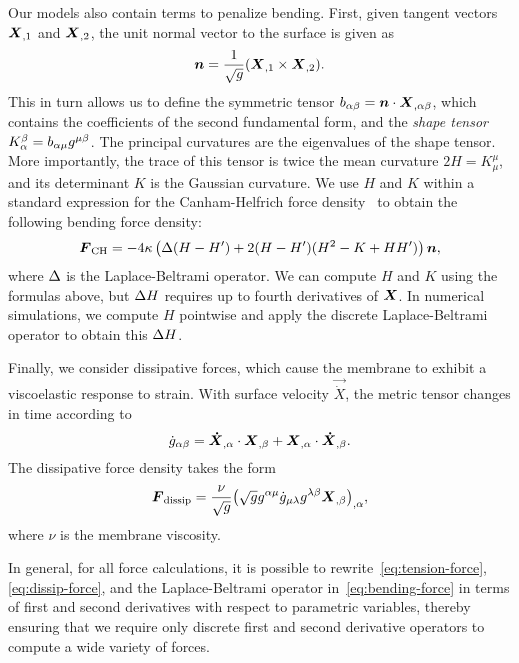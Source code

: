 Our models also contain terms to penalize bending. First, given tangent vectors $\boldsymbol{X}_{,1}$ and $\boldsymbol{X}_{,2}$, the unit
normal vector to the surface is given as
\begin{equation}\label{eq:unit-normal}
\boldsymbol{n} = \frac{1}{\sqrt{g}} (\boldsymbol{X}_{,1}\times\boldsymbol{X}_{,2}).
\end{equation}
This in turn allows us to define the symmetric tensor $b_{\alpha\beta} = \boldsymbol{n}\cdot\boldsymbol{X}_{,\alpha\beta}$, which contains
the coefficients of the second fundamental form, and the \emph{shape tensor}
$K_\alpha^\beta = b_{\alpha\mu}g^{\mu\beta}$. The principal curvatures are the eigenvalues of the shape
tensor. More importantly, the trace of this tensor is twice the mean curvature $2H = K_\mu^\mu$, and its
determinant $K$ is the Gaussian curvature. We use $H$ and $K$ within a standard expression for the Canham-Helfrich
force density~\cite{Zhongcan:1989ue} to obtain the following bending force density:
\begin{equation}\label{eq:bending-force}
    \boldsymbol{F}_\text{CH} = -4\kappa\left(\Delta(H-H')+2(H-H')(H^2-K+HH')\right)\boldsymbol{n},
\end{equation}
where $\Delta$ is the Laplace-Beltrami operator. We can compute $H$ and $K$ using the formulas above, but
$\Delta H$ requires up to fourth derivatives of $\boldsymbol{X}$. In numerical simulations, we compute $H$ pointwise and
apply the discrete Laplace-Beltrami operator to obtain this $\Delta H$.

Finally, we consider dissipative forces, which cause the membrane to exhibit a viscoelastic response to strain.
With surface velocity $\vec{\dot{X}}$, the metric tensor changes in time according to
\begin{equation}
    \dot{g}_{\alpha\beta} = \boldsymbol{\dot{X}}_{,\alpha}\cdot\boldsymbol{X}_{,\beta} + \boldsymbol{X}_{,\alpha}\cdot\boldsymbol{\dot{X}}_{,\beta}.
\end{equation}
The dissipative force density takes the form~\cite{Rangamani:2012hi}
\begin{equation}\label{eq:dissip-force}
    \boldsymbol{F}_\text{dissip} = \frac{\nu}{\sqrt{g}}{\left(\sqrt{g}g^{\alpha\mu}\dot{g}_{\mu\lambda}g^{\lambda\beta}\boldsymbol{X}_{,\beta}\right)}_{,\alpha},
\end{equation}
where $\nu$ is the membrane viscosity.

In general, for all force calculations, it is possible to rewrite~\eqref{eq:tension-force},~%
\eqref{eq:dissip-force}, and the Laplace-Beltrami operator in~\eqref{eq:bending-force} in terms of first and
second derivatives with respect to parametric variables, thereby ensuring that we require only discrete first and
second derivative operators to compute a wide variety of forces.
